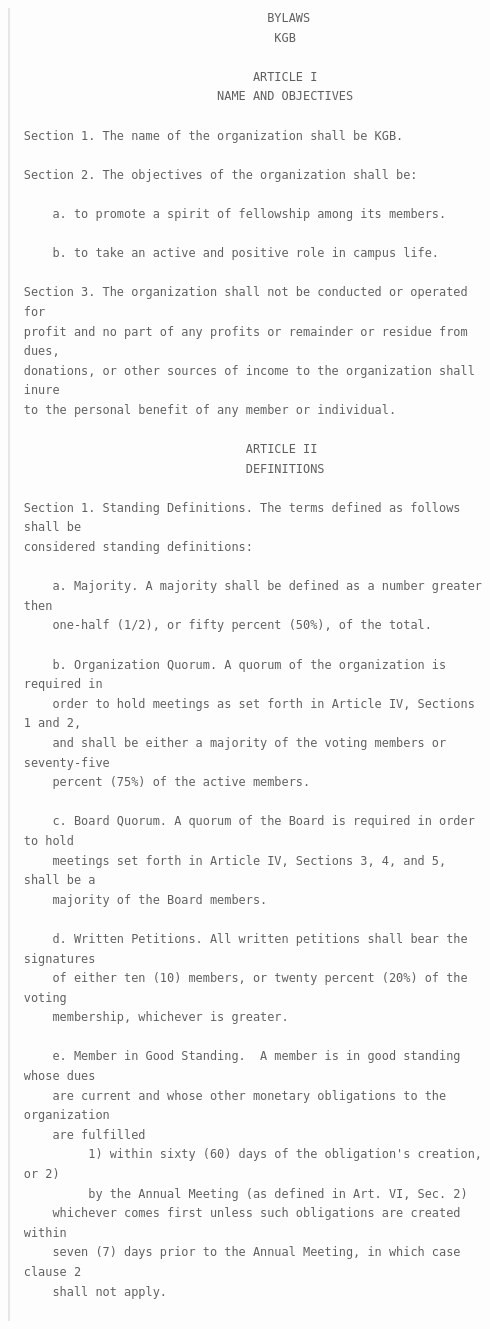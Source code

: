 \documentclass{article}
\begin{document}
\topmargin-2cm
\textwidth16.5cm
\begin{quote}
\begin{verbatim}
                                  BYLAWS
                                   KGB

                                ARTICLE I
                           NAME AND OBJECTIVES

Section 1. The name of the organization shall be KGB.

Section 2. The objectives of the organization shall be:

    a. to promote a spirit of fellowship among its members.

    b. to take an active and positive role in campus life.

Section 3. The organization shall not be conducted or operated for
profit and no part of any profits or remainder or residue from dues,
donations, or other sources of income to the organization shall inure
to the personal benefit of any member or individual.

                               ARTICLE II
                               DEFINITIONS

Section 1. Standing Definitions. The terms defined as follows shall be
considered standing definitions:

    a. Majority. A majority shall be defined as a number greater then
    one-half (1/2), or fifty percent (50%), of the total.

    b. Organization Quorum. A quorum of the organization is required in
    order to hold meetings as set forth in Article IV, Sections 1 and 2,
    and shall be either a majority of the voting members or seventy-five
    percent (75%) of the active members.

    c. Board Quorum. A quorum of the Board is required in order to hold
    meetings set forth in Article IV, Sections 3, 4, and 5, shall be a
    majority of the Board members.

    d. Written Petitions. All written petitions shall bear the signatures
    of either ten (10) members, or twenty percent (20%) of the voting
    membership, whichever is greater.

    e. Member in Good Standing.  A member is in good standing whose dues
    are current and whose other monetary obligations to the organization
    are fulfilled
         1) within sixty (60) days of the obligation's creation, or 2)
         by the Annual Meeting (as defined in Art. VI, Sec. 2)
    whichever comes first unless such obligations are created within
    seven (7) days prior to the Annual Meeting, in which case clause 2
    shall not apply.


\end{verbatim}
\end{quote}
\end{document}
